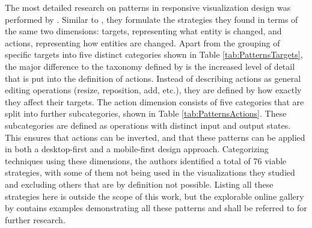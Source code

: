 The most detailed research on patterns in responsive visualization design was performed by \cite{DesignPatternsTradeOffsRespVis}. Similar to \cite{TechniquesForFlexibleRespVisDesign}, they formulate the strategies they found in terms of the same two dimensions: targets, representing what entity is changed, and actions, representing how entities are changed. Apart from the grouping of specific targets into five distinct categories shown in Table \ref{tab:PatternsTargets}, the major difference to the taxonomy defined by \cite{TechniquesForFlexibleRespVisDesign} is the increased level of detail that is put into the definition of actions. Instead of describing actions as general editing operations (resize, reposition, add, etc.), they are defined by how exactly they affect their targets. The action dimension consists of five categories that are split into further subcategories, shown in Table \ref{tab:PatternsActions}. These subcategories are defined as operations with distinct input and output states. This ensures that actions can be inverted, and that these patterns can be applied in both a desktop-first and a mobile-first design approach. Categorizing techniques using these dimensions, the authors identified a total of 76 viable strategies, with some of them not being used in the visualizations they studied and excluding others that are by definition not possible. Listing all these strategies here is outside the scope of this work, but the explorable online gallery by \cite{DesignPatternsTradeOffsRespVisGallery} contains examples demonstrating all these patterns and shall be referred to for further research.

